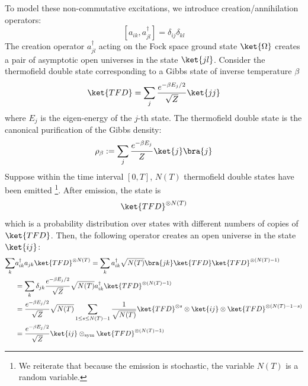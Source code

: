 \documentclass[a4paper,11pt]{article}
\theoremstyle{definition}
\numberwithin{equation}{section}
\begin{document}
To model these non-commutative excitations, we introduce creation/annihilation operators:
\begin{equation}\label{eqn:openunivCCR}
    [a_{ik}, a^\dagger_{jl}] = \delta_{ij}\delta_{kl}
\end{equation}
The creation operator $a^\dagger_{jl}$ acting on the Fock space ground state $\ket{\Omega}$ creates a pair of asymptotic open universes in the state $\ket{jl}$. 
Consider the thermofield double state corresponding to a Gibbs state of inverse temperature $\beta$
\begin{eqnarray}
    \ket{TFD}= \sum_j \frac{e^{-\beta E_j/2}}{\sqrt{Z}}\ket{jj}
\end{eqnarray}
where $E_j$ is the eigen-energy of the $j$-th state. The thermofield double state is the canonical purification of the Gibbs density:
\begin{equation}
    \rho_\beta:= \sum_j \frac{e^{-\beta E_j}}{Z}\ket{j}\bra{j}
\end{equation}
Suppose within the time interval $[0, T]$, $N(T)$ thermofield double states have been emitted \footnote{We reiterate that because the emission is stochastic, the variable $N(T)$ is a random variable.}. After emission, the state is 
\begin{eqnarray}
    \ket{TFD}^{\otimes N(T)}
\end{eqnarray}
which is a probability distribution over states with different numbers of copies of $\ket{TFD}$.
Then, the following operator creates an open universe in the state $\ket{ij}$:
\begin{align}\label{equation:statecreation}
    \begin{split}
        \sum_k& a_{ik}^\dagger a_{jk}\ket{TFD}^{\otimes N(T)}= 
        \sum_k a^\dagger_{ik}\sqrt{N(T)}\bra{jk}\ket{TFD}\ket{TFD}^{\otimes(N(T) - 1)}
        \\&
        =\sum_k \delta_{jk}\frac{e^{-\beta E_j/2}}{\sqrt{Z}}\sqrt{N(T)}a^\dagger_{ik}\ket{TFD}^{\otimes (N(T) - 1)}
        \\&
        =\frac{e^{-\beta E_j/2}}{\sqrt{Z}}\sqrt{N(T)}\sum_{1\leq s\leq N(T) - 1}\frac{1}{\sqrt{N(T)}}\ket{TFD}^{\otimes s}\otimes\ket{ij}\otimes\ket{TFD}^{\otimes (N(T)-1-s)}
        \\&
        =\frac{e^{-\beta E_j/2}}{\sqrt{Z}}\ket{ij}\otimes_\text{sym}\ket{TFD}^{\otimes(N(T) - 1)}
    \end{split}
\end{align}
\end{document}
